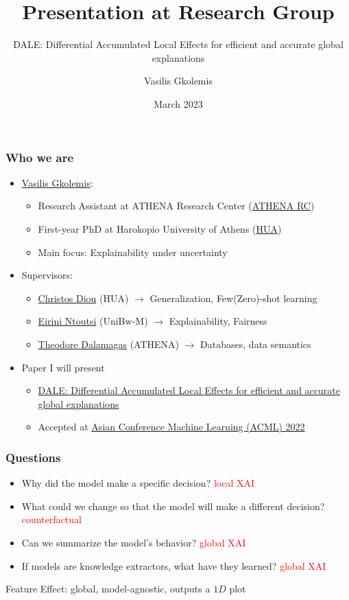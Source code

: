 \documentclass{beamer}
\title[Research Group]{Presentation at Research Group}
\subtitle{DALE: Differential Accumulated Local Effects for efficient and accurate global explanations}
\author[Gkolemis, Vasilis] %
{Vasilis Gkolemis\inst{!,*}}
\institute[ATH-HUA]{
  \inst{!} ATHENA Research and Innovation Center
  \and %
  \inst{*} Harokopio University of Athens
}
\date{March 2023}
\begin{document}
\frame{\titlepage}


\begin{frame}
  \frametitle{Who we are}
  \begin{itemize}
  \item \href{https://givasile.github.io/}{Vasilis Gkolemis}:
    \begin{itemize}
      \item Research Assistant at ATHENA Research Center (\href{https://www.athenarc.gr/en/home}{ATHENA RC})
      \item First-year PhD at Harokopio University of Athens
        (\href{https://dit.hua.gr/index.php/en/}{HUA})
      \item Main focus: Explainability under uncertainty
      \end{itemize}

    \item Supervisors:
      \begin{itemize}
      \item \href{https://diou.github.io/}{Christos Diou} (HUA) \(\rightarrow\) Generalization, Few(Zero)-shot learning
      \item \href{https://aiml-research.github.io/}{Eirini Ntoutsi} (UniBw-M) \(\rightarrow\) Explainability, Fairness
        \item \href{https://scholar.google.gr/citations?user=WJOLNAYAAAAJ&hl=en}{Theodore Dalamagas} (ATHENA) \(\rightarrow\) Databases, data semantics
      \end{itemize}

    \item Paper I will present
      \begin{itemize}
      \item \href{https://givasile.github.io/assets/pdf/gkolemis22_dale.pdf}{DALE: Differential Accumulated Local Effects for efficient and accurate global explanations}
      \item Accepted at \href{https://www.acml-conf.org/2022/}{Asian Conference Machine Learning (ACML) 2022}
      \end{itemize}
    \end{itemize}

\end{frame}

\begin{frame}
  \frametitle{Questions}
  \begin{itemize}
  \item Why did the model make a specific decision? \textcolor{red}{local XAI}
  \item What could we change so that the model will make a different decision? \textcolor{red}{counterfactual}
  \item Can we summarize the model's behavior? \textcolor{red}{global XAI}
  \item If models are knowledge extractors, what have they learned? \textcolor{red}{global XAI}
  \end{itemize}
  \noindent\makebox[\linewidth]{\rule{\paperwidth}{0.4pt}}
  Feature Effect: global, model-agnostic, outputs a \(1D\) plot
\end{frame}
\end{document}
